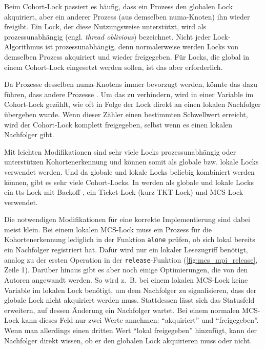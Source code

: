 Beim Cohort-Lock passiert es häufig,
dass ein Prozess den globalen Lock akquiriert,
aber ein anderer Prozess (aus demselben \gls{numa}-Knoten) ihn wieder freigibt.
Ein Lock,
der diese Nutzungsweise unterstützt,
wird als prozessunabhängig (engl. \textit{thread oblivious}) bezeichnet.
Nicht jeder Lock-Algorithmus ist prozessunabhängig,
denn normalerweise werden Locks von demselben Prozess akquiriert
und wieder freigegeben.
Für Locks,
die global in einem Cohort-Lock eingesetzt werden sollen,
ist das aber erforderlich.

Da Prozesse desselben \gls{numa}-Knotens immer bevorzugt werden,
könnte das dazu führen,
dass andere Prozesse .
Um das zu verhindern,
wird in einer Variable im Cohort-Lock gezählt,
wie oft in Folge der Lock direkt an einen lokalen Nachfolger übergeben wurde.
Wenn dieser Zähler einen bestimmten Schwellwert erreicht,
wird der Cohort-Lock komplett freigegeben,
selbst wenn es einen lokalen Nachfolger gibt.

Mit leichten Modifikationen sind sehr viele Locks prozessunabhängig oder unterstützen Kohortenerkennung
und können somit als globale bzw. lokale Locks verwendet werden.
Und da globale und lokale Locks beliebig kombiniert werden können,
gibt es sehr viele Cohort-Locks.
In \cite{Cohort-Lock} werden als globale und lokale Locks
ein \gls{tts}-Lock mit Backoff \cite{TTS-backoff},
ein Ticket-Lock \cite{TKT-Lock} (kurz TKT-Lock)
und MCS-Lock \cite{MCS-Lock} verwendet.

Die notwendigen Modifikationen für eine korrekte Implementierung sind dabei meist klein.
Bei einem lokalen MCS-Lock muss ein Prozess für die Kohortenerkennung lediglich in der Funktion \texttt{alone} prüfen,
ob sich lokal bereits ein Nachfolger registriert hat.
Dafür wird nur ein lokaler Lesezugriff benötigt,
analog zu der ersten Operation in der \texttt{release}-Funktion (\autoref{fig:mcs_mpi_release}, Zeile 1).
Darüber hinaus gibt es aber noch einige Optimierungen,
die von den Autoren angewandt werden.
So wird z.~B. bei einem lokalen MCS-Lock keine Variable im lokalen Lock benötigt,
um dem Nachfolger zu signalisieren,
dass der globale Lock nicht akquiriert werden muss.
Stattdessen lässt sich das Statusfeld erweitern,
auf dessen Änderung ein Nachfolger wartet.
Bei einem normalen MCS-Lock kann dieses Feld nur zwei Werte annehmen: \enquote{akquiriert} und \enquote{freigegeben}.
Wenn man allerdings einen dritten Wert \enquote{lokal freigegeben} hinzufügt,
kann der Nachfolger direkt wissen,
ob er den globalen Lock akquirieren muss oder nicht.


